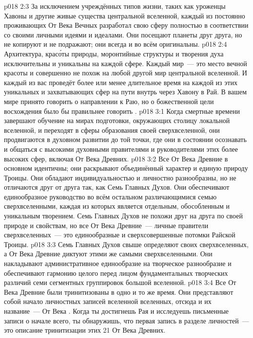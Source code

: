 \vs p018 2:3 За исключением учреждённых типов жизни, таких как уроженцы Хавоны и другие живые существа центральной вселенной, каждый из постоянно проживающих От Века Вечных разработал свою сферу полностью в соответствии со своими личными идеями и идеалами. Они посещают планеты друг друга, но не копируют и не подражают; они всегда и во всём оригинальны.
\vs p018 2:4 Архитектура, крас\'оты природы, моронтийные структуры и творения духа исключительны и уникальны на каждой сфере. Каждый мир~--- это место вечной красоты и совершенно не похож на любой другой мир центральной вселенной. И каждый из вас проведёт более или менее длительное время на каждой из этих уникальных и захватывающих сфер на пути внутрь через Хавону в Рай. В вашем мире принято говорить  о направлении к Раю, но о божественной цели восхождения было бы правильнее говорить .
\vs p018 3:1 Когда смертные времени завершают обучение на мирах подготовки, окружающих столицу локальной вселенной, и переходят в сферы образования своей сверхвселенной, они продвигаются в духовном развитии до той точки, где они в состоянии осознавать и общаться с высокими духовными правителями и руководителями этих более высоких сфер, включая От Века Древних.
\vs p018 3:2 Все От Века Древние в основном идентичны; они раскрывают объединённый характер и единую природу Троицы. Они обладают индивидуальностью и личностно разнообразны, но не отличаются друг от друга так, как Семь Главных Духов. Они обеспечивают единообразное руководство во всём остальном различающимися семью сверхвселенными, каждая из которых является отдельным, обособленным и уникальным творением. Семь Главных Духов не похожи друг на друга по своей природе и свойствам, но все От Века Древние~--- личные правители сверхвселенных~--- это единообразные и сверхсовершенные потомки Райской Троицы.
\vs p018 3:3 Семь Главных Духов свыше определяют  своих сверхвселенных, а От Века Древние диктуют  этими же самыми сверхвселенными. Они накладывают административное единообразие на творческое разнообразие и обеспечивают гармонию целого перед лицом фундаментальных творческих различий семи сегментных группировок большой вселенной.
\vs p018 3:4 \pc Все От Века Древние были тринитизованы в одно и то же время. Они представляют собой начало личностных записей вселенной вселенных, отсюда и их название~--- От Века . Когда ты достигнешь Рая и исследуешь письменные записи о начале всего, ты обнаружишь, что первая запись в разделе личностей~--- это описание тринитизации этих 21 От Века Древних.
